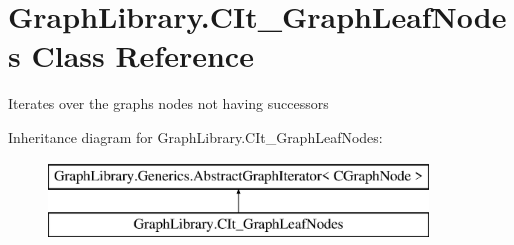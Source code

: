 \hypertarget{class_graph_library_1_1_c_it___graph_leaf_nodes}{}\section{Graph\+Library.\+C\+It\+\_\+\+Graph\+Leaf\+Nodes Class Reference}
\label{class_graph_library_1_1_c_it___graph_leaf_nodes}


Iterates over the graph\textquotesingle{}s nodes not having successors  


Inheritance diagram for Graph\+Library.\+C\+It\+\_\+\+Graph\+Leaf\+Nodes\+:\begin{figure}[H]
\begin{center}
\leavevmode
\includegraphics[height=2.000000cm]{class_graph_library_1_1_c_it___graph_leaf_nodes}
\end{center}
\end{figure}
